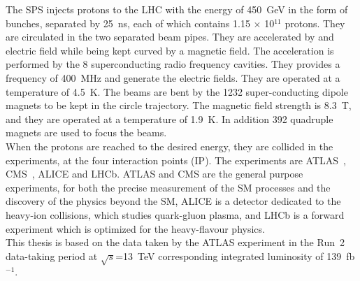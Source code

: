 The SPS injects protons to the LHC with the energy of 450~GeV in the form of bunches, separated by 25~ns, each of which contains 1.15 $\times$ 10$^{11}$ protons. They are circulated in the two separated beam pipes. They are accelerated by and electric field while being kept curved by a magnetic field. The acceleration is performed by the 8 superconducting radio frequency cavities. They provides a frequency of 400~MHz and generate the electric fields. They are operated at a temperature of 4.5~K. The beams are bent by the 1232 super-conducting dipole magnets to be kept in the circle trajectory. The magnetic field strength is 8.3~T, and they are operated at a temperature of 1.9~K. In addition 392 quadruple magnets are used to focus the beams. \\
When the protons are reached to the desired energy, they are collided in the experiments, at the four interaction points (IP). 
The experiments are ATLAS~\cite{PERF-2007-01}, CMS~\cite{CMS-TDR-08-001}, ALICE and LHCb. 
ATLAS and CMS are the general purpose experiments, for both the precise measurement of the SM processes and the discovery of the physics beyond the SM, ALICE is a detector dedicated to the heavy-ion collisions, which studies quark-gluon plasma, and LHCb is a forward experiment which is optimized for the heavy-flavour physics. \\
This thesis is based on the data taken by the ATLAS experiment in the Run~2 data-taking period at $\sqrt{s}$=13~TeV corresponding integrated luminosity of 139~fb$^{-1}$.

